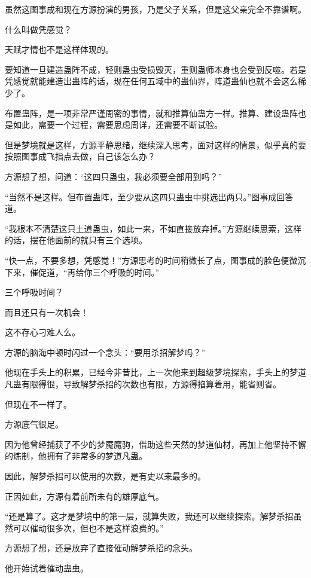 
\begin{this_body}

虽然这图事成和现在方源扮演的男孩，乃是父子关系，但是这父亲完全不靠谱啊。

什么叫做凭感觉？

天赋才情也不是这样体现的。

要知道一旦建造蛊阵不成，轻则蛊虫受损毁灭，重则蛊师本身也会受到反噬。若是凭感觉就能建造出蛊阵的话，现在任何五域中的蛊仙界，阵道蛊仙也就不会这么稀少了。

布置蛊阵，是一项非常严谨周密的事情，就和推算仙蛊方一样。推算、建设蛊阵也是如此，需要一个过程，需要思虑周详，还需要不断试验。

但是梦境就是这样，方源平静思绪，继续深入思考，面对这样的情景，似乎真的要按照图事成飞指点去做，自己该怎么办？

方源想了想，问道：“这四只蛊虫，我必须要全部用到吗？”

“当然不是这样。但布置蛊阵，至少要从这四只蛊虫中挑选出两只。”图事成回答道。

“我根本不清楚这只土道蛊虫，如此一来，不如直接放弃掉。”方源继续思索，这样的话，摆在他面前的就只有三个选项。

“快一点，不要多想，凭感觉！”方源思考的时间稍微长了点，图事成的脸色便微沉下来，催促道，“再给你三个呼吸的时间。”

三个呼吸时间？

而且还只有一次机会！

这不存心刁难人么。

方源的脑海中顿时闪过一个念头：“要用杀招解梦吗？”

他现在手头上的积累，已经今非昔比，上一次他来到超级梦境探索，手头上的梦道凡蛊有限得很，导致解梦杀招的次数也有限，方源得掐算着用，能省则省。

但现在不一样了。

方源底气很足。

因为他曾经捕获了不少的梦魇魔驹，借助这些天然的梦道仙材，再加上他坚持不懈的炼制，他拥有了非常多的梦道凡蛊。

因此，解梦杀招可以使用的次数，是有史以来最多的。

正因如此，方源有着前所未有的雄厚底气。

“还是算了。这才是梦境中的第一层，就算失败，我还可以继续探索。解梦杀招虽然可以催动很多次，但也不是这样浪费的。”

方源想了想，还是放弃了直接催动解梦杀招的念头。

他开始试着催动蛊虫。


\end{this_body}
